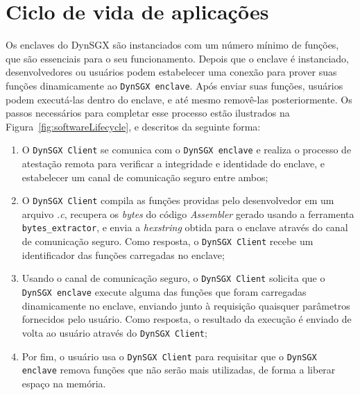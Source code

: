 \section{Ciclo de vida de aplicações}
\label{sec:dynsgx_ciclovida}

Os enclaves do DynSGX são instanciados com um número mínimo de funções, que são
essenciais para o seu funcionamento. Depois que o enclave é instanciado,
desenvolvedores ou usuários podem estabelecer uma conexão para prover suas
funções dinamicamente ao \texttt{DynSGX enclave}. Após enviar suas funções,
usuários podem executá-las dentro do enclave, e até mesmo removê-las
posteriormente. Os passos necessários para completar esse processo estão
ilustrados na Figura~\ref{fig:softwareLifecycle}, e descritos da seguinte forma:

\begin{enumerate}
    \item O \texttt{DynSGX Client} se comunica com o \texttt{DynSGX enclave} e
    realiza o processo de atestação remota para verificar a integridade e
    identidade do enclave, e estabelecer um canal de comunicação seguro entre
    ambos;
    \item O \texttt{DynSGX Client} compila as funções providas pelo
    desenvolvedor em um arquivo \textit{.c}, recupera os \textit{bytes} do
    código \textit{Assembler} gerado usando a ferramenta \texttt
    {bytes\_extractor}, e envia a \textit{hexstring} obtida para o enclave
    através do canal de comunicação seguro. Como resposta, o \texttt{DynSGX
    Client} recebe um identificador das funções carregadas no enclave;
    \item Usando o canal de comunicação seguro, o \texttt{DynSGX Client}
    solicita que o \texttt{DynSGX enclave} execute alguma das funções que foram
    carregadas dinamicamente no enclave, enviando junto à requisição quaisquer
    parâmetros fornecidos pelo usuário. Como resposta, o resultado da execução
    é enviado de volta ao usuário através do \texttt{DynSGX Client};
    \item Por fim, o usuário usa o \texttt{DynSGX Client} para requisitar que o
    \texttt{DynSGX enclave} remova funções que não serão mais utilizadas, de
    forma a liberar espaço na memória.
\end{enumerate}

